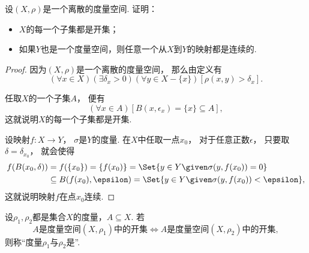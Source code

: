 
\begin{example}
设\((X,\rho)\)是一个离散的度量空间.
证明：\begin{itemize}
	\item \(X\)的每一个子集都是开集；
	\item 如果\(Y\)也是一个度量空间，则任意一个从\(X\)到\(Y\)的映射都是连续的.
\end{itemize}
\begin{proof}
因为\((X,\rho)\)是一个离散的度量空间，
那么由定义有\begin{equation*}
	(\forall x \in X)
	(\exists \delta_x > 0)
	(\forall y \in X - \{x\})
	[\rho(x,y) > \delta_x].
\end{equation*}

任取\(X\)的一个子集\(A\)，
便有\begin{equation*}
	(\forall x \in A)
	[B(x,\epsilon_x) = \{x\} \subseteq A],
\end{equation*}
这就说明\(X\)的每一个子集都是开集.

设映射\(f\colon X \to Y\)，
\(\sigma\)是\(Y\)的度量.
在\(X\)中任取一点\(x_0\)，
对于任意正数\(\epsilon\)，
只要取\(\delta = \delta_{x_0}\)，
就会使得\begin{align*}
	f(B(x_0,\delta))
	&= f(\{x_0\})
	= \{f(x_0)\}
	= \Set{ y \in Y \given \sigma(y,f(x_0)) = 0 } \\
	&\subseteq
	B(f(x_0),\epsilon)
	= \Set{ y \in Y \given \sigma(y,f(x_0)) < \epsilon },
\end{align*}
这就说明映射\(f\)在点\(x_0\)连续.
\end{proof}
\end{example}

\begin{definition}
设\(\rho_1,\rho_2\)都是集合\(X\)的度量，\(A \subseteq X\).
若\begin{equation*}
	\text{\(A\)是度量空间\((X,\rho_1)\)中的开集}
	\iff
	\text{\(A\)是度量空间\((X,\rho_2)\)中的开集},
\end{equation*}
则称“度量\(\rho_1\)与\(\rho_2\)是”.
\end{definition}
